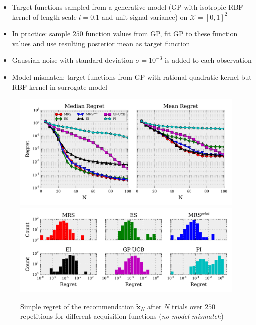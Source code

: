 


\begin{block}{}
\begin{itemize}
 \item Target functions sampled from a generative model (GP with isotropic RBF kernel
of length scale $l = 0.1$ and unit signal variance) on $\mathcal{X} = [0, 1]^2$ 
 \item In practice: sample $250$ function values from GP, fit GP to these function values and use resulting posterior mean as target function
 \item Gaussian noise with standard deviation $\sigma =10^{-3}$ is added to each observation
 \item Model mismatch: target functions from GP with rational quadratic kernel but RBF kernel in surrogate model
\end{itemize}

\begin{center}

\begin{figure}
\centering
\includegraphics[width=.8\columnwidth]{../pics/empirical_comparison} \\
\includegraphics[width=.8\columnwidth]{../pics/hist}
\caption{Simple regret of the recommendation $\mathbf{\tilde x}_N$ after $N$ trials over $250$ repetitions for different acquisition functions (\emph{no model mismatch})}
\label{fig:empirical_comparison}
\end{figure}



\end{center}
\end{block}
